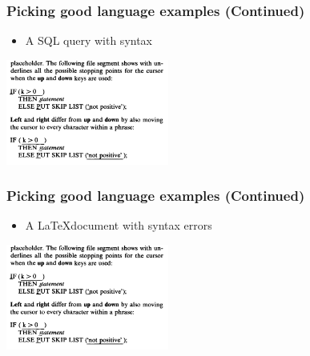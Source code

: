 \documentclass[t,24pt,aspectratio=169]{beamer}
\begin{document}
\begin{frame}[hvid]
    \frametitle{Picking good language examples (Continued)}

    \begin{multicols}{2}
        \begin{itemize}
            \item A SQL query with syntax

        \end{itemize}
        \vfill\null
        \columnbreak
        \includegraphics[width=0.4\textwidth]{img/cornell-ex.png}
    \end{multicols}
\end{frame}

\begin{frame}[hvid]
    \frametitle{Picking good language examples (Continued)}

    \begin{multicols}{2}
        \begin{itemize}
            \item A \LaTeX document with syntax errors

        \end{itemize}
        \vfill\null
        \columnbreak
        \includegraphics[width=0.4\textwidth]{img/cornell-ex.png}
    \end{multicols}
\end{frame}
\end{document}
